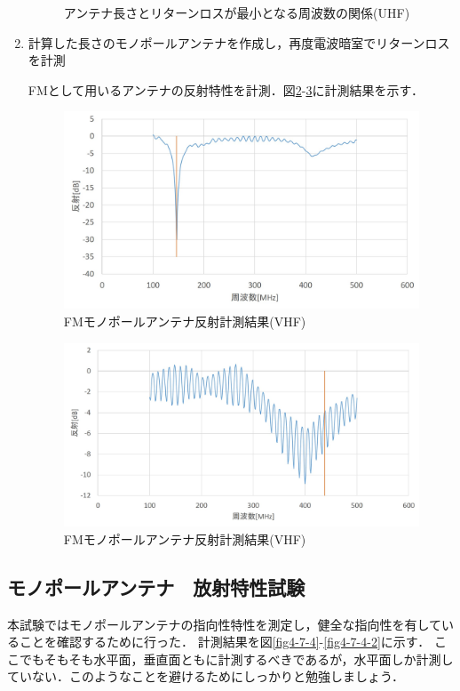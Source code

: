 \begin{enumerate}
\begin{figure}[H]
		\caption{アンテナ長さとリターンロスが最小となる周波数の関係(UHF)}
		\label{fig4-7-2-2}
	\end{figure}
	\item 計算した長さのモノポールアンテナを作成し，再度電波暗室でリターンロスを計測\par
	\quad FMとして用いるアンテナの反射特性を計測．図\ref{fig4-7-3}-\ref{fig4-7-3-2}に計測結果を示す．
	\begin{figure}[H]
		\centering
		\includegraphics[scale=0.5]{04/fig/4-7-3.jpg}
		\caption{FMモノポールアンテナ反射計測結果(VHF)}
		\label{fig4-7-3}
	\end{figure}
	\begin{figure}[H]
		\centering
		\includegraphics[scale=0.5]{04/fig/4-7-3-2.jpg}
		\caption{FMモノポールアンテナ反射計測結果(VHF)}
		\label{fig4-7-3-2}
	\end{figure}
	

\end{enumerate}

\subsection{モノポールアンテナ　放射特性試験}
本試験ではモノポールアンテナの指向性特性を測定し，健全な指向性を有していることを確認するために行った．
計測結果を図\ref{fig4-7-4}-\ref{fig4-7-4-2}に示す．
ここでもそもそも水平面，垂直面ともに計測するべきであるが，水平面しか計測していない．このようなことを避けるためにしっかりと勉強しましょう．


